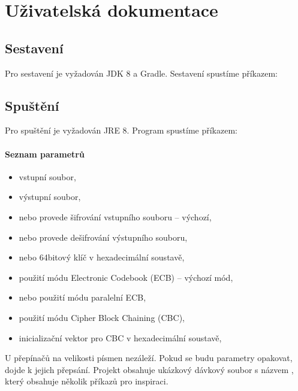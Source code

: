 \documentclass[12pt, a4paper]{article}
\begin{document}
\section{Uživatelská dokumentace}

\subsection{Sestavení}
Pro sestavení je vyžadován JDK 8 a Gradle. Sestavení spustíme příkazem:


\subsection{Spuštění}
Pro spuštění je vyžadován JRE 8. Program spustíme příkazem:


\paragraph{Seznam parametrů}
\begin{itemize}
	\item {} \hspace{10pt} vstupní soubor,
	\item {} \hspace{10pt} výstupní soubor,
	\item {} nebo  \hspace{10pt} provede šifrování vstupního souboru -- výchozí,
	\item {} nebo  \hspace{10pt} provede dešifrování výstupního souboru,
	\item {} nebo  \hspace{10pt} 64bitový klíč v hexadecimální soustavě,
	\item {} \hspace{10pt} použití módu Electronic Codebook (ECB) -- výchozí mód,
	\item {} nebo  \hspace{10pt} použití módu paralelní ECB,
	\item {} \hspace{10pt} použití módu Cipher Block Chaining (CBC),
	\item {} \hspace{10pt} inicializační vektor pro CBC v hexadecimální soustavě,
\end{itemize}
U přepínačů na velikosti písmen nezáleží.
Pokud se budu parametry opakovat, dojde k jejich přepsání.
Projekt obsahuje ukázkový dávkový soubor s názvem , který obsahuje několik příkazů pro inspiraci.
\end{document}
